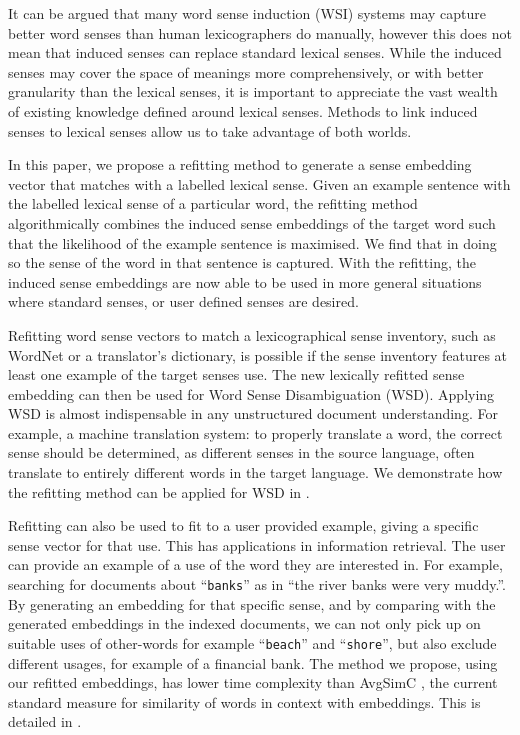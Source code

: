 \documentclass{article}
\def\parencite{\cite}
\newcommand{\wordquote}[1]{\enquote{\texttt{#1}}}
\begin{document}
It can be argued that many word sense induction (WSI) systems may capture better word senses than human lexicographers do manually, however this does not mean that induced senses can replace standard lexical senses. While the induced senses may cover the space of meanings more comprehensively, or with better granularity than the lexical senses, it is important to appreciate the vast wealth of existing knowledge defined around lexical senses. Methods to link induced senses to lexical senses allow us to take advantage of both worlds.


In this paper, we propose a refitting method to generate a sense embedding vector that matches with a labelled lexical sense.
Given an example sentence with the labelled lexical sense of a particular word, the refitting method algorithmically combines the induced sense embeddings of the target word such that the likelihood of the example sentence is maximised. We find that in doing so the sense of the word in that sentence is captured.
With the refitting, the induced sense embeddings are now able to be used in more general situations where standard senses, or user defined senses are desired.


Refitting word sense vectors to match a lexicographical sense inventory, such as WordNet or a translator's dictionary, is possible if the sense inventory features at least one example of the target senses use. The new lexically refitted sense embedding can then be used for Word Sense Disambiguation (WSD). 
Applying WSD is almost indispensable in any unstructured document understanding.
For example, a machine translation system: to properly translate a word, the correct sense should be determined, as different senses in the source language, often translate to entirely different words in the target language.
We demonstrate how the refitting method can be applied for WSD in .

Refitting can also be used to fit to a user provided example, giving a specific sense vector for that use.
This has applications in information retrieval. 
The user can provide an example of a use of the word they are interested in. For example, searching for documents about 
\wordquote{banks} as in \enquote{the river banks were very muddy.}. By generating an embedding for that specific sense, and by comparing with the generated embeddings in the indexed documents, we can not only pick up on suitable uses of other-words for example \wordquote{beach} and \wordquote{shore},
but also exclude different usages, for example of a financial bank.
The method we propose, using our refitted embeddings, has lower time complexity than AvgSimC \parencite{Reisinger2010}, the current standard measure for similarity of words in context with embeddings. This is detailed in .
\end{document}
